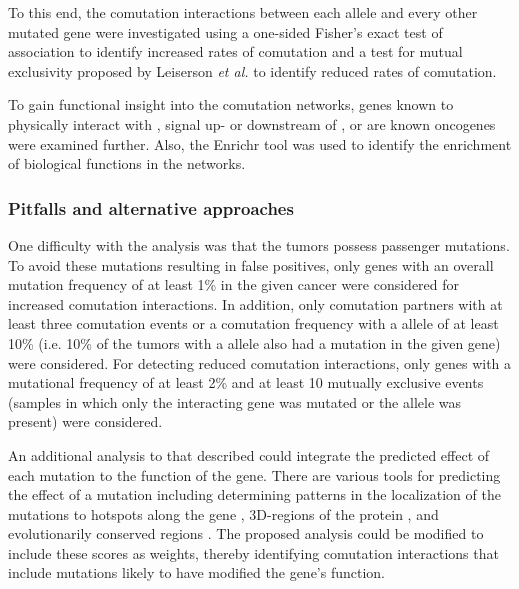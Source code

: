 To this end, the comutation interactions between each \KRAS{} allele and every other mutated gene were investigated using a one-sided Fisher's exact test of association to identify increased rates of comutation and a test for mutual exclusivity proposed by Leiserson \emph{et al.} \cite{Leiserson2016} to identify reduced rates of comutation.

To gain functional insight into the comutation networks, genes known to physically interact with \kras{} \cite{Kovalski2019}, signal up- or downstream of \kras{} \cite{Kanehisa2017, Kanehisa2016KEGGAnnotation.}, or are known oncogenes \cite{Bamford2004TheWebsite., Sondka2018} were examined further.
Also, the Enrichr tool \cite{Chen2013, Kuleshov2016Enrichr:Update.} was used to identify the enrichment of biological functions in the networks.


\subsubsection*{Pitfalls and alternative approaches}

One difficulty with the analysis was that the tumors possess passenger mutations.
To avoid these mutations resulting in false positives, only genes with an overall mutation frequency of at least 1\% in the given cancer were considered for increased comutation interactions.
In addition, only comutation partners with at least three comutation events or a comutation frequency with a \KRAS{} allele of at least 10\% (i.e. 10\% of the tumors with a \KRAS{} allele also had a mutation in the given gene) were considered.
For detecting reduced comutation interactions, only genes with a mutational frequency of at least 2\% and at least 10 mutually exclusive events (samples in which only the interacting gene was mutated or the \KRAS{} allele was present) were considered.

An additional analysis to that described could integrate the predicted effect of each mutation to the function of the gene.
There are various tools for predicting the effect of a mutation including determining patterns in the localization of the mutations to hotspots along the gene \cite{Carter2009, Dees2012, Lawrence2013, Tamborero2013, Porta-Pardo2014}, 3D-regions of the protein \cite{Reimand2013, Porta-Pardo2015, Mularoni2016, Niu2016, Tokheim2016a, Gao2017a}, and evolutionarily conserved regions \cite{Kumar2009, Adzhubei2010, Reva2011, Carter2013a, Shihab2013}.
The proposed analysis could be modified to include these scores as weights, thereby identifying comutation interactions that include mutations likely to have modified the gene's function.

